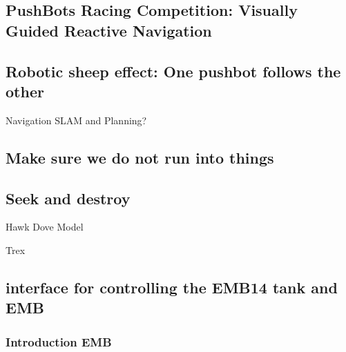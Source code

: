 
\subsection{PushBots Racing Competition: Visually Guided Reactive Navigation}


\subsection{Robotic \textquotedbl{}sheep\textquotedbl{} effect: One pushbot follows
the other}

Navigation SLAM and Planning? 


\subsection{Make sure we do not run into things}


\subsection{Seek and destroy }

Hawk Dove Model 

Trex


\subsection{interface for controlling the EMB14 tank and EMB}


\subsubsection{Introduction EMB}

